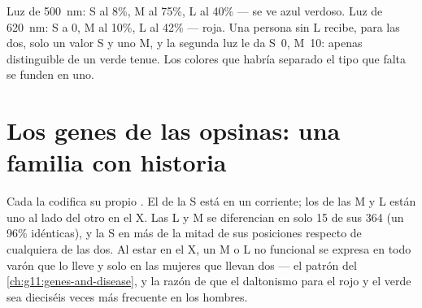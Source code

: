 \begin{example}\label{ex:g11:the-eye:curves}
Luz de \qty{500}{nm}:  S al 8\%, M al 75\%, L al 40\% --- se ve
azul verdoso. Luz de \qty{620}{nm}: S a 0, M al 10\%, L al 42\% ---
roja. Una persona sin  L recibe, para las dos, solo un valor S y
uno M, y la segunda luz le da S~0, M~10: apenas distinguible de un
verde tenue. Los colores que habría separado el tipo que falta se
funden en uno.
\end{example}

\section{Los genes de las opsinas: una familia con historia}

\begin{proposition}\label{prop:g11:the-eye:genes}
Cada  la codifica su propio . El  de la  S está en un
 corriente; los  de las  M y L están uno al lado
del otro en el  X. Las  L y M se diferencian en solo
15 de sus 364  (un 96\% idénticas), y la  S en más
de la mitad de sus posiciones respecto de cualquiera de las dos. Al
estar en el X, un  M o L no funcional se expresa en todo varón que
lo lleve y solo en las mujeres que llevan dos --- el patrón del
\cref{ch:g11:genes-and-disease}, y la razón de que el daltonismo para
el rojo y el verde sea dieciséis veces más frecuente en los hombres.
\end{proposition}
\admitted

